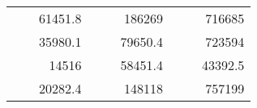 \begin{table}[]
\begin{tabular}{|ccrccrccr}
\rowcolor[HTML]{DDFDFF} 
\multicolumn{1}{|c|}{\cellcolor[HTML]{FFFFC7}}                                & \multicolumn{1}{c|}{\cellcolor[HTML]{DDFDFF}}                      & \multicolumn{1}{r|}{\cellcolor[HTML]{DAE8FC}61451.8}   & \multicolumn{1}{c|}{\cellcolor[HTML]{FFFFC7}}                                & \multicolumn{1}{c|}{\cellcolor[HTML]{DDFDFF}}                       & \multicolumn{1}{r|}{\cellcolor[HTML]{DDFDFF}186269}    & \multicolumn{1}{c|}{\cellcolor[HTML]{FFFFC7}}                                & \multicolumn{1}{c|}{\cellcolor[HTML]{DDFDFF}}                      & \multicolumn{1}{r|}{\cellcolor[HTML]{DDFDFF}716685}    \\ \cline{3-3} \cline{6-6} \cline{9-9} 
\multicolumn{1}{|c|}{\cellcolor[HTML]{FFFFC7}}                                & \multicolumn{1}{c|}{\cellcolor[HTML]{DDFDFF}}                      & \multicolumn{1}{r|}{\cellcolor[HTML]{DDFDFF}35980.1}   & \multicolumn{1}{c|}{\cellcolor[HTML]{FFFFC7}}                                & \multicolumn{1}{c|}{\cellcolor[HTML]{DDFDFF}}                       & \multicolumn{1}{r|}{\cellcolor[HTML]{DAE8FC}79650.4}   & \multicolumn{1}{c|}{\cellcolor[HTML]{FFFFC7}}                                & \multicolumn{1}{c|}{\cellcolor[HTML]{DDFDFF}}                      & \multicolumn{1}{r|}{\cellcolor[HTML]{DAE8FC}723594}    \\ \cline{3-3} \cline{6-6} \cline{9-9} 
\rowcolor[HTML]{DDFDFF} 
\multicolumn{1}{|c|}{\cellcolor[HTML]{FFFFC7}}                                & \multicolumn{1}{c|}{\cellcolor[HTML]{DDFDFF}}                      & \multicolumn{1}{r|}{\cellcolor[HTML]{DAE8FC}14516}     & \multicolumn{1}{c|}{\cellcolor[HTML]{FFFFC7}}                                & \multicolumn{1}{c|}{\cellcolor[HTML]{DDFDFF}}                       & \multicolumn{1}{r|}{\cellcolor[HTML]{DDFDFF}58451.4}   & \multicolumn{1}{c|}{\cellcolor[HTML]{FFFFC7}}                                & \multicolumn{1}{c|}{\cellcolor[HTML]{DDFDFF}}                      & \multicolumn{1}{r|}{\cellcolor[HTML]{DDFDFF}43392.5}   \\ \cline{3-3} \cline{6-6} \cline{9-9} 
\multicolumn{1}{|c|}{\cellcolor[HTML]{FFFFC7}}                                & \multicolumn{1}{c|}{\cellcolor[HTML]{DDFDFF}}                      & \multicolumn{1}{r|}{\cellcolor[HTML]{DDFDFF}20282.4}   & \multicolumn{1}{c|}{\cellcolor[HTML]{FFFFC7}}                                & \multicolumn{1}{c|}{\cellcolor[HTML]{DDFDFF}}                       & \multicolumn{1}{r|}{\cellcolor[HTML]{DAE8FC}148118}    & \multicolumn{1}{c|}{\cellcolor[HTML]{FFFFC7}}                                & \multicolumn{1}{c|}{\cellcolor[HTML]{DDFDFF}}                      & \multicolumn{1}{r|}{\cellcolor[HTML]{DAE8FC}757199}    \\ \cline{3-3} \cline{6-6} \cline{9-9} 

\end{tabular}
\end{table}

